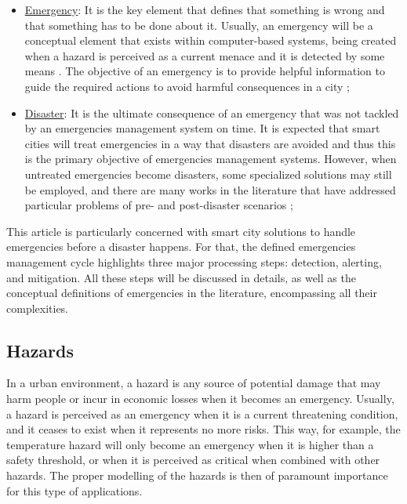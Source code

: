 \begin{refsection}
\begin{itemize}
    \item \underline{Emergency}: It is the key element that defines that something is wrong and that something has to be done about it. Usually, an emergency will be a conceptual element that exists within computer-based systems, being created when a hazard is perceived as a current menace and it is detected by some means \cite{socialmedia1,citiesdisasters1}. The objective of an emergency is to provide helpful information to guide the required actions to avoid harmful consequences in a city \cite{emergenciesgeneral1};
    
    \item \underline{Disaster}: It is the ultimate consequence of an emergency that was not tackled by an emergencies management system on time. It is expected that smart cities will treat emergencies in a way that disasters are avoided and thus this is the primary objective of emergencies management systems. However, when untreated emergencies become disasters, some specialized solutions may still be employed, and there are many works in the literature that have addressed particular problems of pre- and post-disaster scenarios \cite{citiesdisasters1,citiesdisasters2};

\end{itemize}

This article is particularly concerned with smart city solutions to handle emergencies before a disaster happens. For that, the defined emergencies management cycle highlights three major processing steps: detection, alerting, and mitigation. All these steps will be discussed in details, as well as the conceptual definitions of emergencies in the literature, encompassing all their complexities. 

\subsection {Hazards}

In a urban environment, a hazard is any source of potential damage that may harm people or incur in economic losses when it becomes an emergency. Usually, a hazard is perceived as an emergency when it is a current threatening condition, and it ceases to exist when it represents no more risks. This way, for example, the temperature hazard will only become an emergency when it is higher than a safety threshold, or when it is perceived as critical when combined with other hazards. The proper modelling of the hazards is then of paramount importance for this type of applications.


\end{refsection}
